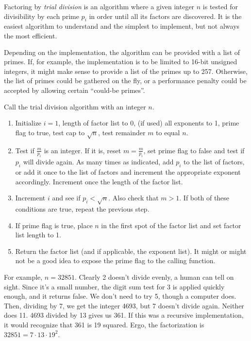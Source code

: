 \documentclass[12pt]{article}
\begin{document}
Factoring by {\em trial division} is an algorithm where a given integer $n$ is tested for divisibility by each prime $p_i$ in order until all its factors are discovered. It is the easiest algorithm to understand and the simplest to implement, but not always the most efficient.

Depending on the implementation, the algorithm can be provided with a list of primes. If, for example, the implementation is to be limited to 16-bit unsigned integers, it might make sense to provide a list of the primes up to 257. Otherwise, the list of primes could be gathered on the fly, or a performance penalty could be accepted by allowing certain ``could-be primes''.

Call the trial division algorithm with an integer $n$.

\begin{enumerate}
\item Initialize $i = 1$, length of factor list to 0, (if used) all exponents to 1, prime flag to true, test cap to $\sqrt{n}$, test remainder $m$ to equal $n$.
\item Test if $\frac{m}{p_i}$ is an integer. If it is, reset $m = \frac{m}{p_i}$, set prime flag to false and test if $p_i$ will divide again. As many times as indicated, add $p_i$ to the list of factors, or add it once to the list of factors and increment the appropriate exponent accordingly. Increment once the length of the factor list.
\item Increment $i$ and see if $p_i < \sqrt{n}$. Also check that $m > 1$. If both of these conditions are true, repeat the previous step.
\item If prime flag is true, place $n$ in the first spot of the factor list and set factor list length to 1.
\item Return the factor list (and if applicable, the exponent list). It might or might not be a good idea to expose the prime flag to the calling function.
\end{enumerate}

For example, $n = 32851$. Clearly 2 doesn't divide evenly, a human can tell on sight. Since it's a small number, the digit sum test for 3 is applied quickly enough, and it returns false. We don't need to try 5, though a computer does. Then, dividing by 7, we get the integer 4693, but 7 doesn't divide again. Neither does 11. 4693 divided by 13 gives us 361. If this was a recursive implementation, it would recognize that 361 is 19 squared. Ergo, the factorization is $32851 = 7 \cdot 13 \cdot 19^2$.
\end{document}
